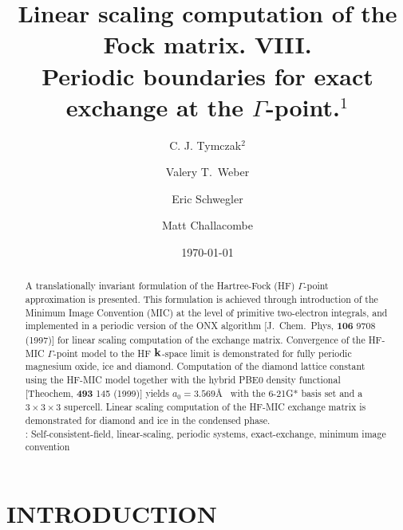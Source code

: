 \documentclass[prb,aps,nobibnotes,twocolumn,doublespace,twocolumngrid,superbib,showpacs]{revtex4}
\begin{document}
\title{Linear scaling computation of the Fock matrix.  VIII. \\  
       Periodic boundaries for exact exchange at the $\Gamma$-point.$^1$ }

\author{C. J. Tymczak$^2$}
\author{Valery T.~Weber}
\author{Eric Schwegler}
\author{Matt Challacombe}

\date{\today}
\begin{abstract}
A translationally invariant formulation of the Hartree-Fock (HF) $\Gamma$-point approximation
is presented.   This formulation is achieved through introduction of  the  Minimum Image Convention (MIC) at 
the level of primitive two-electron integrals, and implemented in a periodic version of the 
ONX algorithm [J.~Chem.~Phys, {\bf 106} 9708 (1997)] for linear scaling computation of the
exchange matrix. Convergence of the HF-MIC $\Gamma$-point model to the HF ${\bf k}$-space limit 
is demonstrated for fully periodic magnesium oxide, ice and diamond.  Computation of the diamond
lattice constant using the HF-MIC model together with the hybrid PBE0 density functional 
[Theochem, {\bf 493} 145 (1999)] yields $a_0=3.569$\AA~ with the 6-21G* basis set and a 
$3\times3\times3$ supercell.  Linear scaling computation of the HF-MIC exchange matrix is demonstrated 
for diamond and ice in the condensed phase. \\
: Self-consistent-field, linear-scaling, periodic systems, exact-exchange, minimum image convention
\end{abstract}


\maketitle


\section{INTRODUCTION}
\end{document}
